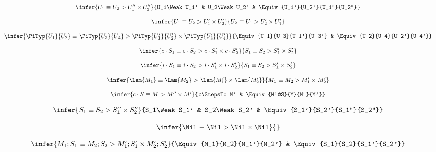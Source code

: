 $$
\begin{array}{c}
\infer{\Equiv{U_1}{U_2}{U_1''}{U_2''}}{U_1\Weak U_1' & U_2\Weak U_2' & \Equiv{U_1'}{U_2'}{U_1''}{U_2''}}\\\\
\infer{\Equiv{U_1}{U_2}{U_1'}{U_2'}}{\Equiv{U_2}{U_1}{U_2'}{U_1'}} \\\\
\infer{\Equiv{\PiTyp{U_1}{U_2}}{\PiTyp{U_3}{U_4}}{\PiTyp{U_1'}{U_2'}}{\PiTyp{U_3'}{U_4'}}}{\Equiv{U_1}{U_3}{U_1'}{U_3'} & \Equiv{U_2}{U_4}{U_2'}{U_4'}} \\\\
\infer{\Equiv{c\cdot S_1}{c\cdot S_2}{c\cdot S_1'}{c\cdot S_2'}}{\Equiv{S_1}{S_2}{S_1'}{S_2'}} \\\\
\infer{\Equiv{i\cdot S_1}{i\cdot S_2}{i\cdot S_1'}{i\cdot S_2'}}{\Equiv{S_1}{S_2}{S_1'}{S_2'}} \\\\
\infer{\Equiv{\Lam{M_1}}{\Lam{M_2}}{\Lam{M_1'}}{\Lam{M_2'}}}{\Equiv{M_1}{M_2}{M_1'}{M_2'}} \\\\
\infer{\Equiv{c\cdot S}{M}{M''}{M'}}{c\StepsTo M' & \Equiv{M'@S}{M}{M''}{M'}} 
\end{array} 
$$

\bigskip 
{}
\bigskip 

$$
\begin{array}{c}
\infer{\Equiv{S_1}{S_2}{S_1''}{S_2''}}{S_1\Weak S_1' & S_2\Weak S_2' & \Equiv{S_1'}{S_2'}{S_1''}{S_2''}}\\\\
\infer{\Equiv{\Nil}{\Nil}{\Nil}{\Nil}}{}\\\\
\infer{\Equiv{M_1;S_1}{M_2;S_2}{M_1';S_1'}{M_2';S_2'}}{\Equiv{M_1}{M_2}{M_1'}{M_2'} & \Equiv{S_1}{S_2}{S_1'}{S_2'}} \\\\
\end{array} 
$$

